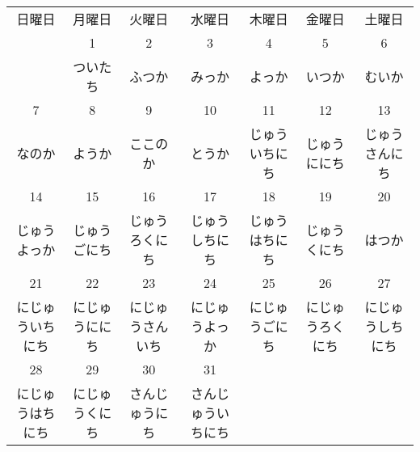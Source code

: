 \documentclass[notoc,notitlepage]{tufte-book}
\begin{document}
\begin{fullwidth}
\begin{tabular}{c c c c c c c}
日曜日                          & 月曜日                        & 火曜日                          & 水曜日                            & 木曜日                        & 金曜日                          & 土曜日 \\
                                & 1                             & 2                               & 3                                 & 4                             & 5                               & 6 \\
                                & ついたち                      & ふつか                          & みっか                            & よっか                        & いつか                          & むいか \\
7                               & 8                             & 9                               & 10                                & 11                            & 12                              & 13 \\
なのか                          & ようか                        & ここのか                        & とうか                            & \scriptsize{ じゅういちにち } & \scriptsize{ じゅうににち }     & \scriptsize{ じゅうさんにち } \\
14                              & 15                            & 16                              & 17                                & 18                            & 19                              & 20 \\
\scriptsize{ じゅうよっか }     & \scriptsize{ じゅうごにち }   & \scriptsize{ じゅうろくにち }   & \scriptsize{ じゅうしちにち }     & \scriptsize{ じゅうはちにち } & \scriptsize{ じゅうくにち }     & はつか \\
21                              & 22                            & 23                              & 24                                & 25                            & 26                              & 27 \\
\scriptsize{ にじゅういちにち } & \scriptsize{ にじゅうににち } & \scriptsize{ にじゅうさんいち } & \scriptsize{ にじゅうよっか }     & \scriptsize{ にじゅうごにち } & \scriptsize{ にじゅうろくにち } & \scriptsize{ にじゅうしちにち } \\
28                              & 29                            & 30                              & 31 \\
\scriptsize{ にじゅうはちにち } & \scriptsize{ にじゅうくにち } & \scriptsize{ さんじゅうにち }   & \scriptsize{ さんじゅういちにち }
\end{tabular}
\end{fullwidth}
\end{document}
